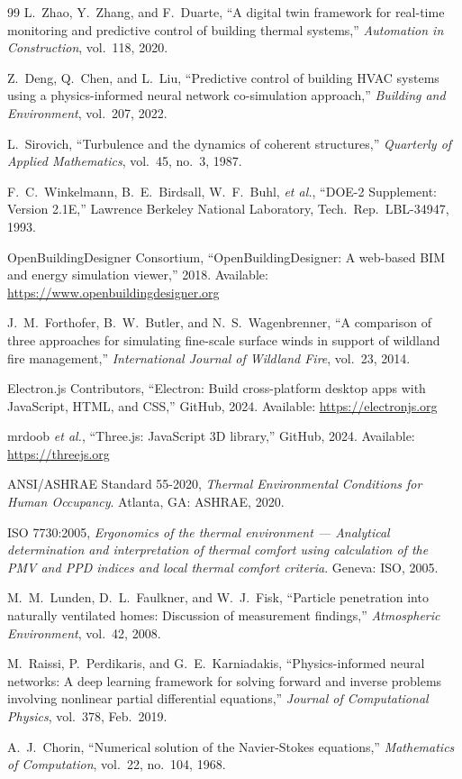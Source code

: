 \documentclass[12pt,a4paper]{report}
\begin{document}
\begin{thebibliography}{99}
L.\ Zhao, Y.\ Zhang, and F.\ Duarte, ``A digital twin framework for real-time monitoring and predictive control of building thermal systems,'' \textit{Automation in Construction}, vol.\ 118, 2020.

Z.\ Deng, Q.\ Chen, and L.\ Liu, ``Predictive control of building HVAC systems using a physics-informed neural network co-simulation approach,'' \textit{Building and Environment}, vol.\ 207, 2022.

L.\ Sirovich, ``Turbulence and the dynamics of coherent structures,'' \textit{Quarterly of Applied Mathematics}, vol.\ 45, no.\ 3, 1987.

F.\ C.\ Winkelmann, B.\ E.\ Birdsall, W.\ F.\ Buhl, \emph{et al.}, ``DOE-2 Supplement: Version 2.1E,'' Lawrence Berkeley National Laboratory, Tech.\ Rep.\ LBL-34947, 1993.

OpenBuildingDesigner Consortium, ``OpenBuildingDesigner: A web-based BIM and energy simulation viewer,'' 2018. Available: \url{https://www.openbuildingdesigner.org}

J.\ M.\ Forthofer, B.\ W.\ Butler, and N.\ S.\ Wagenbrenner, ``A comparison of three approaches for simulating fine-scale surface winds in support of wildland fire management,'' \textit{International Journal of Wildland Fire}, vol.\ 23, 2014.

Electron.js Contributors, ``Electron: Build cross-platform desktop apps with JavaScript, HTML, and CSS,'' GitHub, 2024. Available: \url{https://electronjs.org}

mrdoob \emph{et al.}, ``Three.js: JavaScript 3D library,'' GitHub, 2024. Available: \url{https://threejs.org}

ANSI/ASHRAE Standard 55-2020, \textit{Thermal Environmental Conditions for Human Occupancy}. Atlanta, GA: ASHRAE, 2020.

ISO 7730:2005, \textit{Ergonomics of the thermal environment --- Analytical determination and interpretation of thermal comfort using calculation of the PMV and PPD indices and local thermal comfort criteria}. Geneva: ISO, 2005.

M.\ M.\ Lunden, D.\ L.\ Faulkner, and W.\ J.\ Fisk, ``Particle penetration into naturally ventilated homes: Discussion of measurement findings,'' \textit{Atmospheric Environment}, vol.\ 42, 2008.

M.\ Raissi, P.\ Perdikaris, and G.\ E.\ Karniadakis, ``Physics-informed neural networks: A deep learning framework for solving forward and inverse problems involving nonlinear partial differential equations,'' \textit{Journal of Computational Physics}, vol.\ 378, Feb.\ 2019.

A.\ J.\ Chorin, ``Numerical solution of the Navier-Stokes equations,'' \textit{Mathematics of Computation}, vol.\ 22, no.\ 104, 1968.

\end{thebibliography}
\end{document}
